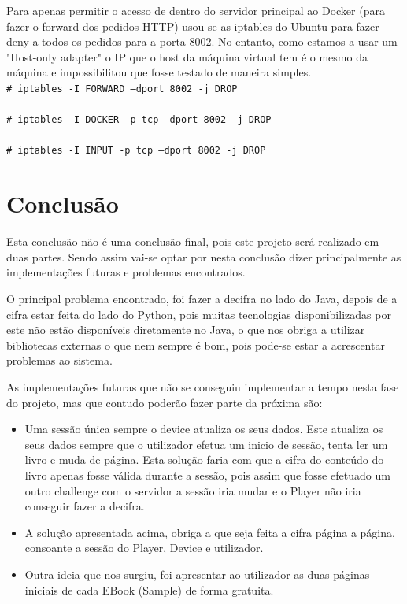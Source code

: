 \documentclass[pdftex,12pt,a4paper]{report}
\newcommand{\shellcmd}[1]{\\\indent\indent\texttt{\footnotesize\# #1}\\}
\begin{document}
Para apenas permitir o acesso de dentro do servidor principal ao Docker (para fazer o forward dos pedidos HTTP) usou-se as iptables do Ubuntu para fazer deny a todos os pedidos para a porta 8002. No entanto, como estamos a usar um "Host-only adapter" o IP que o host da máquina virtual tem é o mesmo da máquina e impossibilitou que fosse testado de maneira simples.
\shellcmd{iptables -I FORWARD  --dport 8002 -j DROP}
\shellcmd{iptables -I DOCKER -p tcp --dport 8002 -j DROP}
\shellcmd{iptables -I INPUT -p tcp --dport 8002 -j DROP}

\newpage
\section{Conclusão}

Esta conclusão não é uma conclusão final, pois este projeto será realizado em duas partes.
Sendo assim vai-se optar por nesta conclusão dizer principalmente as implementações futuras e problemas encontrados.

O principal problema encontrado, foi fazer a decifra no lado do Java, depois de a cifra estar feita do lado do Python, pois muitas tecnologias disponibilizadas por este não estão disponíveis diretamente no Java, o que nos obriga a utilizar bibliotecas externas o que nem sempre é bom, pois pode-se estar a acrescentar problemas ao sistema. 

As implementações futuras que não se conseguiu implementar a tempo nesta fase do projeto, mas que contudo poderão fazer parte da próxima são:
\begin{itemize}
\item Uma sessão única sempre o device atualiza os seus dados. Este atualiza os seus dados sempre que o utilizador efetua um inicio de sessão, tenta ler um livro e muda de página. Esta solução faria com que a cifra do conteúdo do livro apenas fosse válida durante a sessão, pois assim que fosse efetuado um outro challenge com o servidor a sessão iria mudar e o Player não iria conseguir fazer a decifra.
\item A solução apresentada acima, obriga a que seja feita a cifra página a página, consoante a sessão do Player, Device e utilizador.
\item Outra ideia que nos surgiu, foi apresentar ao utilizador as duas páginas iniciais de cada EBook (Sample) de forma gratuita.
\end{itemize}

\renewcommand{\bibname}{Referências}
\end{document}

